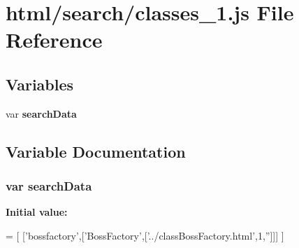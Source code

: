 \section{html/search/classes\-\_\-1.js File Reference}
\label{classes__1_8js}
\subsection*{Variables}
\begin{DoxyCompactItemize}
\item 
var {\bf search\-Data}
\end{DoxyCompactItemize}


\subsection{Variable Documentation}
\subsubsection[{search\-Data}]{\setlength{\rightskip}{0pt plus 5cm}var search\-Data}\label{classes__1_8js_ad01a7523f103d6242ef9b0451861231e}
{\bfseries Initial value\-:}
\begin{DoxyCode}
=
[
  [\textcolor{stringliteral}{'bossfactory'},[\textcolor{stringliteral}{'BossFactory'},[\textcolor{stringliteral}{'../classBossFactory.html'},1,\textcolor{stringliteral}{''}]]]
]
\end{DoxyCode}
